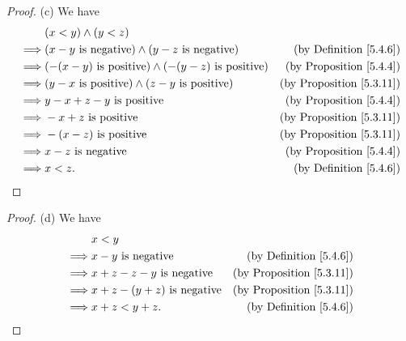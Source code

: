 \begin{proof}{(c)}
    We have
    \begin{align*}
                 & (x < y) \land (y < z)                                                                                      \\
        \implies & (x - y \text{ is negative}) \land (y - z \text{ is negative})       & \text{(by Definition \ref{5.4.6})}   \\
        \implies & (-(x - y) \text{ is positive}) \land (-(y - z) \text{ is positive}) & \text{(by Proposition \ref{5.4.4})}  \\
        \implies & (y - x \text{ is positive}) \land (z - y \text{ is positive})       & \text{(by Proposition \ref{5.3.11})} \\
        \implies & y - x + z - y \text{ is positive}                                   & \text{(by Proposition \ref{5.4.4})}  \\
        \implies & - x + z \text{ is positive}                                         & \text{(by Proposition \ref{5.3.11})} \\
        \implies & -(x - z) \text{ is positive}                                        & \text{(by Proposition \ref{5.3.11})} \\
        \implies & x - z \text{ is negative}                                           & \text{(by Proposition \ref{5.4.4})}  \\
        \implies & x < z.                                                              & \text{(by Definition \ref{5.4.6})}
    \end{align*}
\end{proof}

\begin{proof}{(d)}
    We have
    \begin{align*}
                 & x < y                                                                      \\
        \implies & x - y \text{ is negative}           & \text{(by Definition \ref{5.4.6})}   \\
        \implies & x + z - z - y \text{ is negative}   & \text{(by Proposition \ref{5.3.11})} \\
        \implies & x + z - (y + z) \text{ is negative} & \text{(by Proposition \ref{5.3.11})} \\
        \implies & x + z < y + z.                      & \text{(by Definition \ref{5.4.6})}
    \end{align*}
\end{proof}

